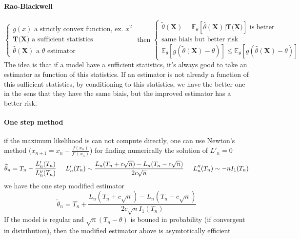 \documentclass[a4paper,10pt]{article}
\begin{document}
\paragraph{Rao-Blackwell}
\[
\left\{
\begin{array}{l}
g(x) \text{ a strictly convex function, ex. } x^2\\
\textbf{T(X)} \text{ a sufficient statistics}  \\
\widehat{\theta}(\textbf{X}) \text{ a } \theta \text{ estimator}
\end{array}\right.
\text{  then  }
\left\{
\begin{array}{l}
\widetilde{\theta}(\textbf{X}) = \mathbb{E}_{\theta}[\widehat{\theta}(\textbf{X}) | \textbf{T(X)} ] \text{ is better} \\
\text{same biais but better risk} \\
\mathbb{E}_{\theta}[g(\widetilde{\theta}(\textbf{X}) - \theta) ] \leq \mathbb{E}_{\theta}[g(\widehat{\theta}(\textbf{X}) - \theta) ] 
\end{array}\right.
\]
The idea is that if a model have a sufficient statistics, it's always good to take an estimator as function of this statistics. 
If an estimator is not already a function of this sufficient statistics, by conditioning to this statistics, we have the better one 
in the sens that they have the same biais, but the improved estimator has a better risk.

\paragraph{One step method} if the maximum likelihood is can not compute directly, one can use Newton's method ($x_{n+1}=x_n - \frac{f(x_n)}{f'(x_n)}$) for finding numerically 
the solution of $L'_n = 0 $
\[
\widetilde{\theta}_n =  T_n - \frac{L'_n(T_n)}{L''_n(T_n)} 
\hspace{5mm}
L'_n(T_n) \sim \frac{L_n(T_n + c\sqrt{n}) - L_n(T_n - c\sqrt{n}) }{2c\sqrt{n}}
\hspace{5mm}
L''_n(T_n) \sim -nI_1(T_n)
\]
we have the one step modified estimator
\[
\widetilde{\theta}_n =  T_n + \frac{L_n(T_n + c\sqrt{n}) - L_n(T_n - c\sqrt{n}) }{2c\sqrt{n} I_1(T_n)}
\]
If the model is regular and $\sqrt{n}(T_n - \theta)$ is bouned in probability (if convergent in distribution), then the modified estimator above is asymtotically efficient
\end{document}
